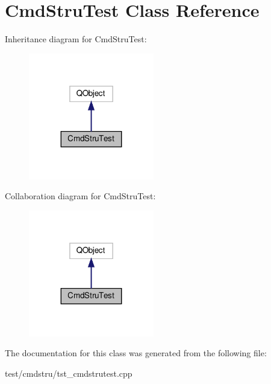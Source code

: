 \hypertarget{classCmdStruTest}{}\section{Cmd\+Stru\+Test Class Reference}
\label{classCmdStruTest}


Inheritance diagram for Cmd\+Stru\+Test\+:
\nopagebreak
\begin{figure}[H]
\begin{center}
\leavevmode
\includegraphics[width=155pt]{classCmdStruTest__inherit__graph}
\end{center}
\end{figure}


Collaboration diagram for Cmd\+Stru\+Test\+:
\nopagebreak
\begin{figure}[H]
\begin{center}
\leavevmode
\includegraphics[width=155pt]{classCmdStruTest__coll__graph}
\end{center}
\end{figure}


The documentation for this class was generated from the following file\+:\begin{DoxyCompactItemize}
\item 
test/cmdstru/tst\+\_\+cmdstrutest.\+cpp\end{DoxyCompactItemize}
